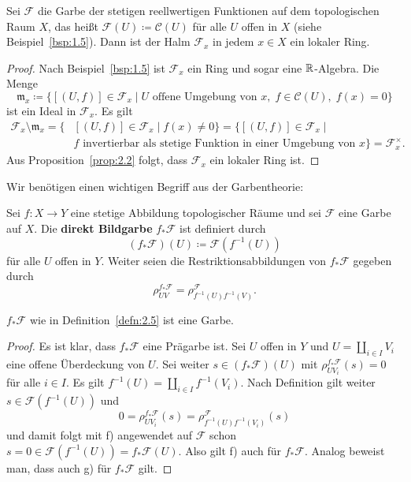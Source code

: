 \begin{bsp}
\label{bsp:2.4}
	Sei $\mathcal{F}$ die Garbe der stetigen reellwertigen Funktionen auf dem topologischen Raum $X$, das heißt $\mathcal{F}(U) \coloneqq \mathcal{C}(U)$ für alle $U$ offen in $X$ (siehe Beispiel~\ref{bsp:1.5}). Dann ist der Halm $\mathcal{F}_x$ in jedem $x \in X$ ein lokaler Ring.
	\begin{proof}
		Nach Beispiel~\ref{bsp:1.5} ist $\mathcal{F}_x$ ein Ring und sogar eine $\mathbb {R}$-Algebra. Die Menge
		\[
			\mathfrak{m}_x\coloneqq \{ [(U,f)] \in \mathcal{F}_x \mid U \text{ offene Umgebung von } x,\; f \in \mathcal{C}(U), \; f(x) = 0 \}
		\]
		ist ein Ideal in $\mathcal{F}_x$. Es gilt
		\begin{align*}
			\mathcal{F}_x \setminus \mathfrak{m}_x = \{ &[(U,f)] \in \mathcal{F}_x \mid f(x) \neq 0\} = \{[(U,f)] \in \mathcal{F}_x \mid\\
			&f \text{ invertierbar als stetige Funktion in einer Umgebung von } x \} = \mathcal{F}_x^\times.
		\end{align*}
		Aus Proposition~\ref{prop:2.2} folgt, dass $\mathcal{F}_x$ ein lokaler Ring ist.
	\end{proof}
\end{bsp}

Wir benötigen einen wichtigen Begriff aus der Garbentheorie:

\begin{defn}
\label{defn:2.5}
	Sei $f\colon X \to Y$ eine stetige Abbildung topologischer Räume und sei $\mathcal{F}$ eine Garbe auf $X$. Die \textbf{direkt Bildgarbe} $f_*\mathcal{F}$ ist definiert durch
	\[
		(f_*\mathcal{F})(U) \coloneqq \mathcal{F}(f^{-1}(U))
	\]
	für alle $U$ offen in $Y$. Weiter seien die Restriktionsabbildungen von $f_*\mathcal{F}$ gegeben durch 
	\[
		\rho_{UV}^{f_*\mathcal{F}} = \rho_{f^{-1}(U)f^{-1}(V)}^{\mathcal{F}}.
	\]
\end{defn}

\begin{prop}
\label{prop:2.6}
	$f_*\mathcal{F}$ wie in Definition~\ref{defn:2.5} ist eine Garbe.
	\begin{proof}
		Es ist klar, dass $f_*\mathcal{F}$ eine Prägarbe ist. Sei $U$ offen in $Y$ und $U = \coprod_{i\in I}V_i$ eine offene Überdeckung von $U$. Sei weiter $s \in (f_*\mathcal{F})(U)$ mit $\rho_{UV_i}^{f_*\mathcal{F}}(s) = 0$ für alle $i \in I$. Es gilt $f^{-1}(U) = \coprod_{i\in I} f^{-1}(V_i)$. Nach Definition gilt weiter $s \in \mathcal{F}(f^{-1}(U))$ und
		\[
			0 = \rho_{UV_i}^{f_*\mathcal{F}}(s) = \rho_{f^{-1}(U)f^{-1}(V_i)}^{\mathcal{F}}(s)
		\]
		und damit folgt mit f) angewendet auf $\mathcal{F}$ schon $s=0 \in \mathcal{F}(f^{-1}(U)) = f_*\mathcal{F}(U)$. Also gilt f) auch für $f_*\mathcal{F}$. Analog beweist man, dass auch g) für $f_*\mathcal{F}$ gilt.
	\end{proof}
\end{prop}

